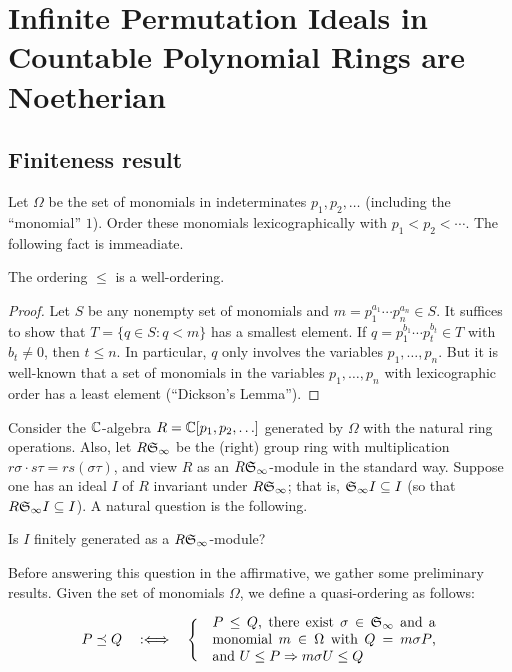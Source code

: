 \chapter{Infinite Permutation Ideals in Countable Polynomial Rings are Noetherian}

\section{Finiteness result}

Let $\Omega$ be the set of monomials in indeterminates $p_1, p_2,
\ldots$ (including the ``monomial'' $1$).  Order these monomials
lexicographically with $p_1 < p_2 < \cdots$.  The following fact
is immeadiate.

\begin{lemma}
The ordering $\leq$ is a well-ordering.
\end{lemma}

\begin{proof} Let $S$ be any nonempty set of monomials and $m = p_1^{a_1}\cdots
p_n^{a_n} \in S$.  It suffices to show that $T = \{q \in S: q <
m\}$ has a smallest element. If $q = p_1^{b_1}\cdots p_t^{b_t} \in
T$ with $b_t \neq 0$, then $t \leq n$.  In particular, $q$ only
involves the variables $p_1,\ldots,p_n$.  But it is well-known
that a set of monomials in the variables $p_1,\ldots,p_n$ with
lexicographic order has a least element (``Dickson's Lemma'').
\end{proof}


Consider the ${\mathbb C}$-algebra $R = {\mathbb C}[p_1,p_2,\ldots]$ generated by
$\Omega$ with the natural ring operations.  Also, let $R {\frak
S}_{\infty}$ be the (right) group ring with multiplication $r
\sigma \cdot s \tau = rs (\sigma \tau)$, and view $R$ as an $R
{\frak S}_{\infty}$-module in the standard way.  Suppose one has
an ideal $I$ of $R$ invariant under $R {\frak S}_{\infty}$; that
is, ${\frak S}_{\infty}I \subseteq I$ (so that $R{\frak
S}_{\infty}I \subseteq I$).  A natural question is the following.

\begin{question}
Is $I$ finitely generated as a $R {\frak S}_{\infty}$-module?
\end{question}

Before answering this question in the affirmative, we gather some
preliminary results.  Given the set of monomials $\Omega$, we
define a quasi-ordering as follows:
\begin{definition}
\[P \preceq Q \quad
:\Longleftrightarrow \quad \begin{cases} &\text{\parbox{160pt}{$P
\leq Q$, there exist $\sigma \in {\frak S}_{\infty}$ and a
monomial $m \in \Omega$ with $Q = m \sigma P$, and $U \leq P
\Rightarrow m \sigma U \leq Q$}}\end{cases}\]
\end{definition}

